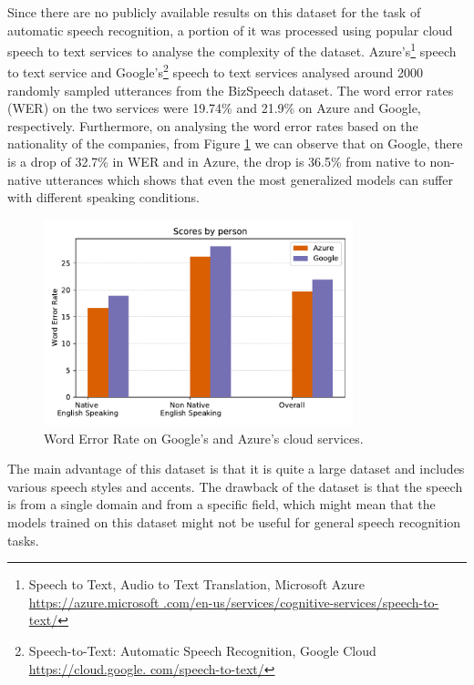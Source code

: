 Since there are no publicly available results on this dataset for the task of automatic speech recognition, a portion of it was processed using popular cloud speech to text services to analyse the complexity of the dataset. Azure's\footnote{Speech to Text, Audio to Text Translation, Microsoft Azure \href{https://azure.microsoft.com/en-us/services/cognitive-services/speech-to-text/}{https://azure.microsoft .com/en-us/services/cognitive-services/speech-to-text/}} speech to text service and Google's\footnote{Speech-to-Text: Automatic Speech Recognition, Google Cloud \href{https://cloud.google.com/speech-to-text/}{https://cloud.google. com/speech-to-text/}} speech to text services analysed around 2000 randomly sampled utterances from the BizSpeech dataset. The word error rates (WER) on the two services were 19.74\% and 21.9\% on Azure and Google, respectively. Furthermore, on analysing the word error rates based on the nationality of the companies, from Figure \ref{fig:wer_cloud} we can observe that on Google, there is a drop of 32.7\% in WER and in Azure, the drop is 36.5\% from native to non-native utterances which shows that even the most generalized models can suffer with different speaking conditions. 

\begin{figure}[ht]
  \begin{center}
    \includegraphics[width=0.8\textwidth]{images/wer_cloud.pdf} 
    \caption{Word Error Rate on Google's and Azure's cloud services.}
    \label{fig:wer_cloud}
  \end{center}
\end{figure}


The main advantage of this dataset is that it is quite a large dataset and includes various speech styles and accents. The drawback of the dataset is that the speech is from a single domain and from a specific field, which might mean that the models trained on this dataset might not be useful for general speech recognition tasks.

